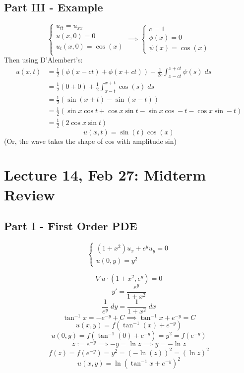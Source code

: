 \documentclass[12pt]{article}
\begin{document}
\subsection*{Part III  - Example}
\[\begin{cases}
    u_{tt} = u_{xx}\\
    u(x, 0) = 0\\
    u_t(x, 0) = \cos(x)\\
\end{cases} \implies \begin{cases}
    c = 1\\
    \phi(x) = 0\\
    \psi(x) = \cos (x)
\end{cases}\]
Then using D'Alembert's:
\begin{align*}
    u(x, t) &= \frac{1}{2}(\phi(x - ct) + \phi(x + ct)) + \frac{1}{2c}\int_{x - ct}^{x + ct} \psi(s)\;ds\\
    &= \frac{1}{2}(0 + 0) + \frac{1}{2} \int_{x - t}^{x +t}\cos(s)\; ds\\
    &= \frac{1}{2}(\sin(x + t) - \sin(x - t))\\
    &= \frac{1}{2}(\sin x \cos t + \cos x \sin t - \sin x \cos -t - \cos x \sin -t)\\
    &= \frac{1}{2}(2 \cos x \sin t)
\end{align*}
\[\boxed{u(x, t) = \sin(t) \cos(x)}\]
(Or, the wave takes the shape of cos with amplitude sin)

\section{Lecture 14, Feb 27: Midterm Review}
\subsection*{Part I  - First Order PDE}
\[\begin{cases}
    (1 + x^2)u_x + e^y u_y = 0\\
    u(0 ,y) = y^2
\end{cases}\]

\[\nabla u \cdot (1 + x^2, e^y) = 0\]
\[y' = \frac{e^y}{1  +x^2}\]
\[\frac{1}{e^y}\; dy = \frac{1}{1 + x^2}\; dx\]
\[\tan^{-1} x = -e^{-y} + C \implies \tan^{-1}x + e^{-y} = C\]
\[u(x, y) = f(\tan^{-1}(x) + e^{-y})\]
\[u(0, y) = f(\tan^{-1}(0) + e^{-y}) = y^2 = f(e^{-y})\]
\[z := e^{-y} \implies -y = \ln z \implies y = - \ln z\]
\[f(z) = f(e^{-y}) = y^2 = (-\ln(z))^2 = (\ln z)^2\]
\[\boxed{u(x, y) = \ln(\tan^{-1} x + e^{-y})^2}\]
\end{document}
